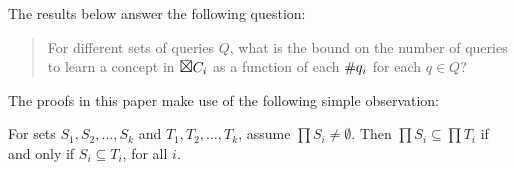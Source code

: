 The results below answer the following question:
\begin{quote}
For different sets of queries $Q$, what is the bound on the number of queries to learn a concept in $\Boxtimes C_i $ as a function of each $\#q_{i}$ for each $q \in Q$?
\end{quote}

The proofs in this paper make use of the following simple observation:
\begin{observation}
\label{subobs}
For sets $S_1, S_2, \dots, S_k$ and $T_1, T_2, \dots, T_k$, assume $\prod S_i \ne \emptyset$.  Then $\prod S_i \subseteq \prod T_i$ if and only if $S_i \subseteq T_i$, for all $i$.
\end{observation}

